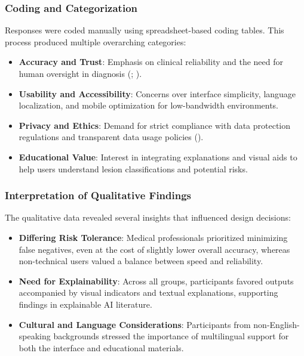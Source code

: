 \documentclass[
  12pt,
  oneside]{article}
\providecommand{\tightlist}{%
  \setlength{\itemsep}{0pt}\setlength{\parskip}{0pt}}
\begin{document}
\subsubsection{Coding and
Categorization}\label{coding-and-categorization}

Responses were coded manually using spreadsheet-based coding tables.
This process produced multiple overarching categories:

\begin{itemize}
\tightlist
\item
  \textbf{Accuracy and Trust}: Emphasis on clinical reliability and the
  need for human oversight in diagnosis
  (;
  ).
\item
  \textbf{Usability and Accessibility}: Concerns over interface
  simplicity, language localization, and mobile optimization for
  low-bandwidth environments.
\item
  \textbf{Privacy and Ethics}: Demand for strict compliance with data
  protection regulations and transparent data usage policies
  ().
\item
  \textbf{Educational Value}: Interest in integrating explanations and
  visual aids to help users understand lesion classifications and
  potential risks.
\end{itemize}

\subsubsection{Interpretation of Qualitative
Findings}\label{interpretation-of-qualitative-findings}

The qualitative data revealed several insights that influenced design
decisions:

\begin{itemize}
\tightlist
\item
  \textbf{Differing Risk Tolerance}: Medical professionals prioritized
  minimizing false negatives, even at the cost of slightly lower overall
  accuracy, whereas non-technical users valued a balance between speed
  and reliability.
\item
  \textbf{Need for Explainability}: Across all groups, participants
  favored outputs accompanied by visual indicators and textual
  explanations, supporting findings in explainable AI literature.
\item
  \textbf{Cultural and Language Considerations}: Participants from
  non-English-speaking backgrounds stressed the importance of
  multilingual support for both the interface and educational materials.
\end{itemize}
\end{document}
